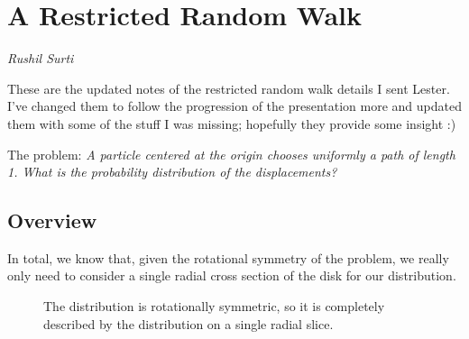 \documentclass[10pt]{article}
\theoremstyle{customthm}
\begin{document}
\section*{A Restricted Random Walk}

\vspace{-0.2cm}

\textit{Rushil Surti}

\vspace{0.2cm}

These are the updated notes of the restricted random walk details I sent Lester. I've changed them to follow the progression of the presentation more and updated them with some of the stuff I was missing; hopefully they provide some insight :)

The problem: \textit{A particle centered at the origin chooses uniformly a path of length 1. What is the probability distribution of the displacements?}

\subsection*{Overview}

In total, we know that, given the rotational symmetry of the problem, we really only need to consider a single radial cross section of the disk for our distribution.

\begin{figure}[b]
    \centering
    \caption{The distribution is rotationally symmetric, so it is completely described by the distribution on a single radial slice.}
\end{figure}
\end{document}
